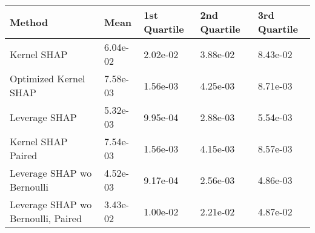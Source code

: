 \begin{tabular}{lllll}
  \toprule
  \textbf{Method} & \textbf{Mean} & \textbf{1st Quartile} & \textbf{2nd Quartile} & \textbf{3rd Quartile} \\ \midrule 
Kernel SHAP & 6.04e-02 & 2.02e-02 & 3.88e-02 & 8.43e-02\\
Optimized Kernel SHAP & 7.58e-03 & \cellcolor{bronze!60}1.56e-03 & 4.25e-03 & 8.71e-03\\
Leverage SHAP & \cellcolor{silver!60}5.32e-03 & \cellcolor{silver!60}9.95e-04 & \cellcolor{silver!60}2.88e-03 & \cellcolor{silver!60}5.54e-03\\
Kernel SHAP Paired & \cellcolor{bronze!60}7.54e-03 & \cellcolor{bronze!60}1.56e-03 & \cellcolor{bronze!60}4.15e-03 & \cellcolor{bronze!60}8.57e-03\\
Leverage SHAP wo Bernoulli & \cellcolor{gold!60}4.52e-03 & \cellcolor{gold!60}9.17e-04 & \cellcolor{gold!60}2.56e-03 & \cellcolor{gold!60}4.86e-03\\
Leverage SHAP wo Bernoulli, Paired & 3.43e-02 & 1.00e-02 & 2.21e-02 & 4.87e-02\\
\bottomrule
\end{tabular}